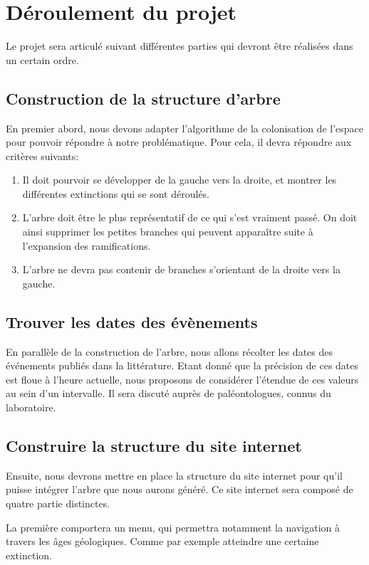 \documentclass[a4paper]{article}
\begin{document}
{\section{Déroulement du projet}
	Le projet sera articulé suivant différentes parties qui devront être réalisées dans un certain ordre.
			
	\subsection{Construction de la structure d'arbre}
		En premier abord, nous devons adapter l'algorithme de la colonisation de l'espace pour pouvoir répondre à notre problématique. Pour cela, il devra répondre aux critères suivants:
		\begin{enumerate}
			\item Il doit pourvoir se développer de la gauche vers la droite, et montrer les différentes extinctions qui se sont déroulés.
			\item L'arbre doit être le plus représentatif de ce qui s'est vraiment passé. On doit ainsi supprimer les petites branches qui peuvent apparaître suite à l'expansion des ramifications.
			\item L'arbre ne devra pas contenir de branches s'orientant de la droite vers la gauche.
		\end{enumerate}
	 
	\subsection{Trouver les dates des évènements}
		En parallèle de la construction de l'arbre, nous allons récolter les dates des événements publiés dans la littérature. Etant donné que la précision de ces dates est floue à l'heure actuelle, nous proposons de considérer l'étendue de ces valeurs au sein d'un intervalle. Il sera discuté auprès de paléontologues, connus du laboratoire.

	\subsection{Construire la structure du site internet}
		Ensuite, nous devrons mettre en place la structure du site internet pour qu'il puisse intégrer l'arbre que nous aurons généré. Ce site internet sera composé de quatre partie distinctes. 

		La première comportera un menu, qui permettra notamment la navigation à travers les âges géologiques. Comme par exemple atteindre une certaine extinction. 

}
\end{document}
